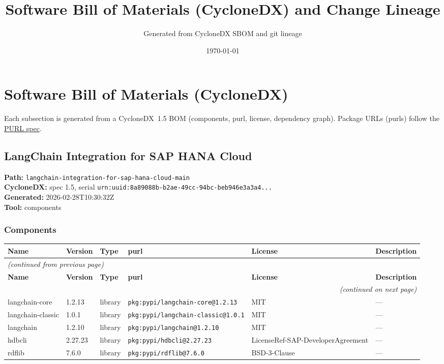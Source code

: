 \documentclass[11pt,a4paper]{article}
\title{\textbf{Software Bill of Materials (CycloneDX) and Change Lineage}}
\author{Generated from CycloneDX SBOM and git lineage}
\date{\today}
\begin{document}
\maketitle
\tableofcontents
\newpage
\section{Software Bill of Materials (CycloneDX)}
Each subsection is generated from a CycloneDX~1.5 BOM (components, purl, license, dependency graph). Package URLs (purls) follow the \href{https://github.com/package-url/purl-spec}{PURL spec}.

\subsection{LangChain Integration for SAP HANA Cloud}
\textbf{Path:} \texttt{langchain-integration-for-sap-hana-cloud-main}
\\ \textbf{CycloneDX:} spec 1.5, serial \texttt{urn:uuid:8a89088b-b2ae-49cc-94bc-beb946e3a3a4...}
\\ \textbf{Generated:} 2026-02-28T10:30:32Z
\\ \textbf{Tool:} components

\subsubsection*{Components}
\begin{longtable}{|p{4cm}|p{2cm}|p{1.6cm}|p{5cm}|p{1.5cm}|p{3.5cm}|}
\toprule
\rowcolor{sbomhdr}\textbf{Name} & \textbf{Version} & \textbf{Type} & \textbf{purl} & \textbf{License} & \textbf{Description} \\
\midrule
\endfirsthead
\multicolumn{6}{l}{\small\itshape (continued from previous page)} \\
\toprule
\rowcolor{sbomhdr}\textbf{Name} & \textbf{Version} & \textbf{Type} & \textbf{purl} & \textbf{License} & \textbf{Description} \\
\midrule
\endhead
\midrule
\multicolumn{6}{r}{\small\itshape (continued on next page)} \\
\endfoot
\bottomrule
\endlastfoot
\raggedright langchain-core & 1.2.13 & library & \small\texttt{pkg:pypi/langchain-core@1.2.13} & MIT & \small — \\
\raggedright langchain-classic & 1.0.1 & library & \small\texttt{pkg:pypi/langchain-classic@1.0.1} & MIT & \small — \\
\raggedright langchain & 1.2.10 & library & \small\texttt{pkg:pypi/langchain@1.2.10} & MIT & \small — \\
\raggedright hdbcli & 2.27.23 & library & \small\texttt{pkg:pypi/hdbcli@2.27.23} & LicenseRef-SAP-DeveloperAgreement & \small — \\
\raggedright rdflib & 7.6.0 & library & \small\texttt{pkg:pypi/rdflib@7.6.0} & BSD-3-Clause & \small — \\
\end{longtable}
\end{document}

